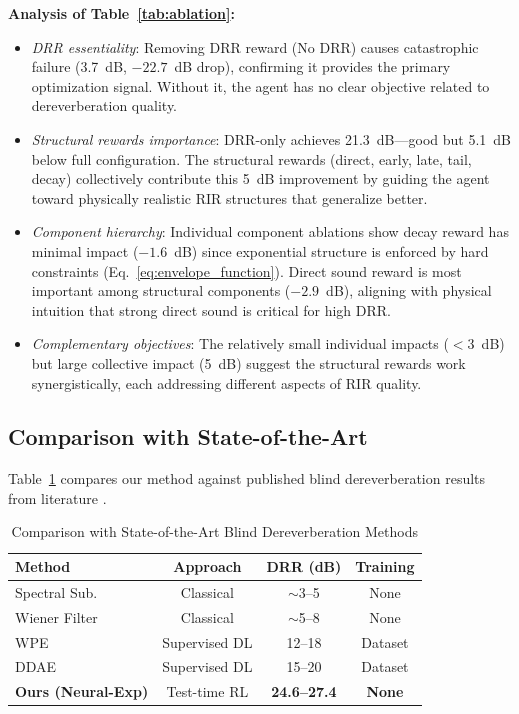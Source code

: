 \documentclass[12pt,a4paper]{article}
\begin{document}
\textbf{Analysis of Table~\ref{tab:ablation}:}
\begin{itemize}
\item \textit{DRR essentiality}: Removing DRR reward (No DRR) causes catastrophic failure (3.7~dB, $-22.7$~dB drop), confirming it provides the primary optimization signal. Without it, the agent has no clear objective related to dereverberation quality.
\item \textit{Structural rewards importance}: DRR-only achieves 21.3~dB---good but 5.1~dB below full configuration. The structural rewards (direct, early, late, tail, decay) collectively contribute this 5~dB improvement by guiding the agent toward physically realistic RIR structures that generalize better.
\item \textit{Component hierarchy}: Individual component ablations show decay reward has minimal impact ($-1.6$~dB) since exponential structure is enforced by hard constraints (Eq.~\eqref{eq:envelope_function}). Direct sound reward is most important among structural components ($-2.9$~dB), aligning with physical intuition that strong direct sound is critical for high DRR.
\item \textit{Complementary objectives}: The relatively small individual impacts ($<$3~dB) but large collective impact (5~dB) suggest the structural rewards work synergistically, each addressing different aspects of RIR quality.
\end{itemize}

\subsection{Comparison with State-of-the-Art}

Table~\ref{tab:sota} compares our method against published blind dereverberation results from literature \cite{kinoshita2017neural,han2015learning,zhang2020simultaneous,delcroix2015context}.

\begin{table}[t]
\centering
\caption{Comparison with State-of-the-Art Blind Dereverberation Methods}
\label{tab:sota}
\small
\begin{tabular}{@{}lccc@{}}
\toprule
\textbf{Method} & \textbf{Approach} & \textbf{DRR (dB)} & \textbf{Training} \\
\midrule
Spectral Sub. \cite{boll1979suppression} & Classical & $\sim$3--5 & None \\
Wiener Filter & Classical & $\sim$5--8 & None \\
WPE \cite{kinoshita2017neural} & Supervised DL & 12--18 & Dataset \\
DDAE & Supervised DL & 15--20 & Dataset \\
\midrule
\textbf{Ours (Neural-Exp)} & Test-time RL & \textbf{24.6--27.4} & \textbf{None} \\
\bottomrule
\end{tabular}
\end{table}
\end{document}
